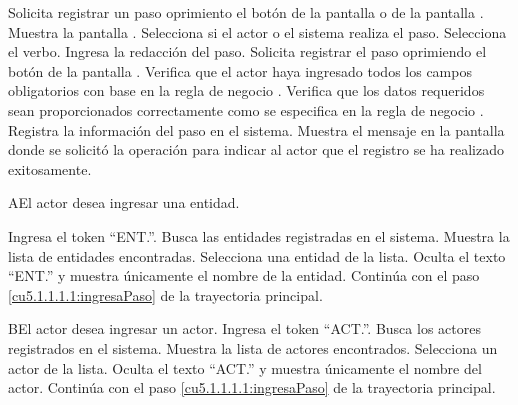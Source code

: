 
 \begin{UCtrayectoria}
	\UCpaso[\UCactor] Solicita registrar un paso oprimiento el botón  de la pantalla  o de la pantalla . 
	\UCpaso[\UCsist] Muestra la pantalla . 
	\UCpaso[\UCactor] Selecciona si el actor o el sistema realiza el paso.\label{cu5.1.1.1.1:ingresaDatos}
	\UCpaso[\UCactor] Selecciona el verbo.
	\UCpaso[\UCactor] Ingresa la redacción del paso.         \label{cu5.1.1.1.1:ingresaPaso}
	\UCpaso[\UCactor] Solicita registrar el paso oprimiendo el botón  de la pantalla .  
	\UCpaso[\UCsist] Verifica que el actor haya ingresado todos los campos obligatorios con base en la regla de negocio . 
	\UCpaso[\UCsist] Verifica que los datos requeridos sean proporcionados correctamente como se especifica en la regla de negocio .  
	\UCpaso[\UCsist] Registra la información del paso en el sistema.
	\UCpaso[\UCsist] Muestra el mensaje  en la pantalla donde se solicitó la operación
	para indicar al actor que el registro se ha realizado exitosamente. 
\end{UCtrayectoria}

    

 \begin{UCtrayectoriaA}{A}{El actor desea ingresar una entidad.}
 	
 	 \UCpaso[\UCactor] Ingresa el token ``ENT.''.
 	\UCpaso[\UCsist] Busca las entidades registradas en el sistema. 
 	\UCpaso[\UCsist] Muestra la lista de entidades encontradas.
 	\UCpaso[\UCactor] Selecciona una entidad de la lista.
  	\UCpaso[\UCsist] Oculta el texto ``ENT.'' y muestra únicamente el nombre de la entidad.
    \UCpaso[] Continúa con el paso \ref{cu5.1.1.1.1:ingresaPaso} de la trayectoria principal.
 \end{UCtrayectoriaA}
 
 \begin{UCtrayectoriaA}{B}{El actor desea ingresar un actor.}
 	\UCpaso[\UCactor] Ingresa el token ``ACT.''.
 	\UCpaso[\UCsist] Busca los actores registrados en el sistema. 
 	\UCpaso[\UCsist] Muestra la lista de actores encontrados.
 	\UCpaso[\UCactor] Selecciona un actor de la lista.
  	\UCpaso[\UCsist] Oculta el texto ``ACT.'' y muestra únicamente el nombre del actor.
    \UCpaso[] Continúa con el paso \ref{cu5.1.1.1.1:ingresaPaso} de la trayectoria principal.
 \end{UCtrayectoriaA}


